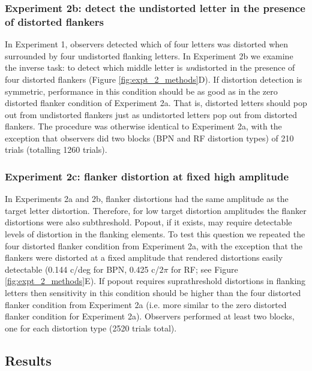 \documentclass[doc, 11pt,a4paper,natbib]{apa6}\usepackage[]{graphicx}\usepackage[]{color}
\begin{document}
\subsubsection{Experiment 2b: detect the undistorted letter in the presence of distorted flankers}

In Experiment 1, observers detected which of four letters was distorted when surrounded by four undistorted flanking letters.
In Experiment 2b we examine the inverse task: to detect which middle letter is \textit{un}distorted in the presence of four distorted flankers (Figure \ref{fig:expt_2_methods}D).
If distortion detection is symmetric, performance in this condition should be as good as in the zero distorted flanker condition of Experiment 2a.
That is, distorted letters should pop out from undistorted flankers just as undistorted letters pop out from distorted flankers.
The procedure was otherwise identical to Experiment 2a, with the exception that observers did two blocks (BPN and RF distortion types) of 210 trials (totalling 1260 trials).

\subsubsection{Experiment 2c: flanker distortion at fixed high amplitude}

In Experiments 2a and 2b, flanker distortions had the same amplitude as the target letter distortion.
Therefore, for low target distortion amplitudes the flanker distortions were also subthreshold.
Popout, if it exists, may require detectable levels of distortion in the flanking elements.
To test this question we repeated the four distorted flanker condition from Experiment 2a, with the exception that the flankers were distorted at a fixed amplitude that rendered distortions easily detectable (0.144 c/deg for BPN, 0.425 c/$2\pi$ for RF; see Figure \ref{fig:expt_2_methods}E).
If popout requires suprathreshold distortions in flanking letters then sensitivity in this condition should be higher than the four distorted flanker condition from Experiment 2a (i.e. more similar to the zero distorted flanker condition for Experiment 2a).
Observers performed at least two blocks, one for each distortion type (2520 trials total).


\subsection{Results}
\end{document}
